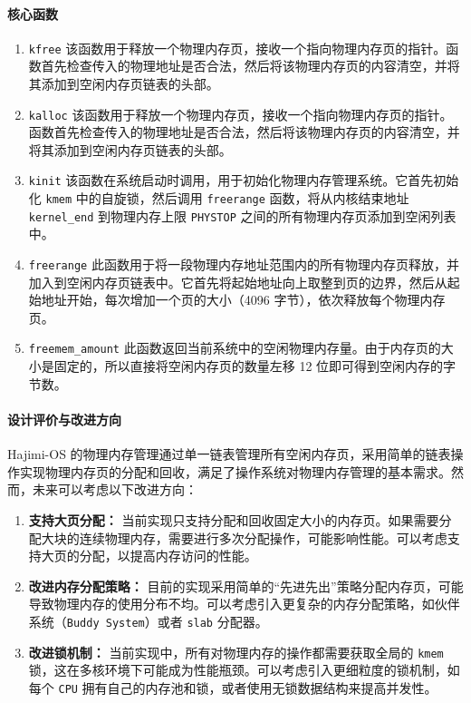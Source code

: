 \documentclass[UTF8]{article}
\begin{document}
\paragraph{核心函数}
\begin{enumerate}[label=\textbf{\arabic*}., wide, labelwidth=!, labelindent=0pt]
  \item \texttt{kfree} 该函数用于释放一个物理内存页，接收一个指向物理内存页的指针。函数首先检查传入的物理地址是否合法，然后将该物理内存页的内容清空，并将其添加到空闲内存页链表的头部。
  
  \item \texttt{kalloc} 该函数用于释放一个物理内存页，接收一个指向物理内存页的指针。函数首先检查传入的物理地址是否合法，然后将该物理内存页的内容清空，并将其添加到空闲内存页链表的头部。
  
  \item \texttt{kinit} 该函数在系统启动时调用，用于初始化物理内存管理系统。它首先初始化 \texttt{kmem} 中的自旋锁，然后调用 \texttt{freerange} 函数，将从内核结束地址 \texttt{kernel\_end} 到物理内存上限 \texttt{PHYSTOP} 之间的所有物理内存页添加到空闲列表中。
  
  \item \texttt{freerange} 此函数用于将一段物理内存地址范围内的所有物理内存页释放，并加入到空闲内存页链表中。它首先将起始地址向上取整到页的边界，然后从起始地址开始，每次增加一个页的大小（4096 字节），依次释放每个物理内存页。
  
  \item \texttt{freemem\_amount} 此函数返回当前系统中的空闲物理内存量。由于内存页的大小是固定的，所以直接将空闲内存页的数量左移 12 位即可得到空闲内存的字节数。
  
\end{enumerate}


\paragraph{设计评价与改进方向\\}
Hajimi-OS 的物理内存管理通过单一链表管理所有空闲内存页，采用简单的链表操作实现物理内存页的分配和回收，满足了操作系统对物理内存管理的基本需求。然而，未来可以考虑以下改进方向：
\begin{enumerate}[label=\textbf{\arabic*}., wide, labelwidth=!, labelindent=0pt]
  \item \textbf{支持大页分配：} 当前实现只支持分配和回收固定大小的内存页。如果需要分配大块的连续物理内存，需要进行多次分配操作，可能影响性能。可以考虑支持大页的分配，以提高内存访问的性能。
  \item \textbf{改进内存分配策略：} 目前的实现采用简单的“先进先出”策略分配内存页，可能导致物理内存的使用分布不均。可以考虑引入更复杂的内存分配策略，如伙伴系统（\texttt{Buddy System}）或者 \texttt{slab} 分配器。
  \item \textbf{改进锁机制：} 当前实现中，所有对物理内存的操作都需要获取全局的 \texttt{kmem} 锁，这在多核环境下可能成为性能瓶颈。可以考虑引入更细粒度的锁机制，如每个 \texttt{CPU} 拥有自己的内存池和锁，或者使用无锁数据结构来提高并发性。
\end{enumerate}
\end{document}
